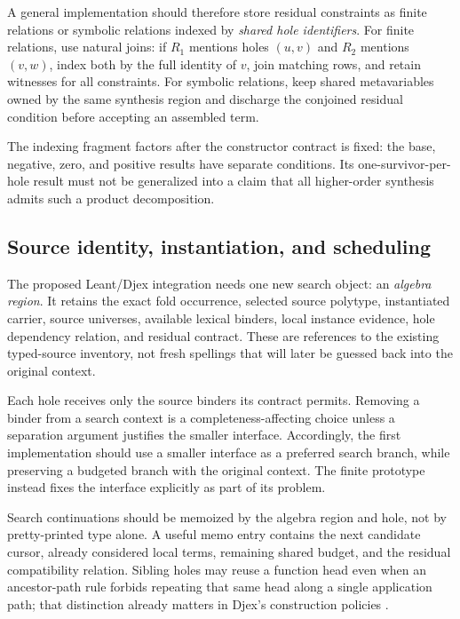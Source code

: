 A general implementation should therefore store residual constraints as finite
relations or symbolic relations indexed by \emph{shared hole identifiers}.
For finite relations, use natural joins: if $R_1$ mentions holes $(u,v)$ and
$R_2$ mentions $(v,w)$, index both by the full identity of $v$, join matching
rows, and retain witnesses for all constraints. For symbolic relations, keep
shared metavariables owned by the same synthesis region and discharge the
conjoined residual condition before accepting an assembled term.

The indexing fragment factors after the constructor contract is fixed: the
base, negative, zero, and positive results have separate conditions. Its
one-survivor-per-hole result must not be generalized into a claim that all
higher-order synthesis admits such a product decomposition.

\subsection{Source identity, instantiation, and scheduling}

The proposed Leant/Djex integration needs one new search object: an
\emph{algebra region}. It retains the exact fold occurrence, selected source
polytype, instantiated carrier, source universes, available lexical binders,
local instance evidence, hole dependency relation, and residual contract. These
are references to the existing typed-source inventory, not fresh spellings that
will later be guessed back into the original context.

Each hole receives only the source binders its contract permits. Removing a
binder from a search context is a completeness-affecting choice unless a
separation argument justifies the smaller interface. Accordingly, the first
implementation should use a smaller interface as a preferred search branch,
while preserving a budgeted branch with the original context. The finite
prototype instead fixes the interface explicitly as part of its problem.

Search continuations should be memoized by the algebra region and hole, not by
pretty-printed type alone. A useful memo entry contains the next candidate
cursor, already considered local terms, remaining shared budget, and the residual
compatibility relation. Sibling holes may reuse a function head even when an
ancestor-path rule forbids repeating that same head along a single application
path; that distinction already matters in Djex's construction policies
\cite{djex-rank}.

